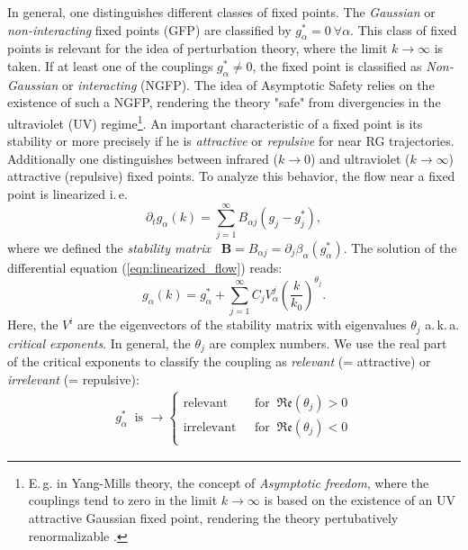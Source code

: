 In general, one distinguishes different classes of fixed points. The \textit{Gaussian} or \textit{non-interacting} fixed points  (GFP) are classified by $g^{*}_{\alpha}=0 \ \forall\alpha$. This class of fixed points is relevant for the idea of perturbation theory, where the limit $k\rightarrow\infty$ is taken. If at least one of the couplings $g^{*}_{\alpha}\neq 0$, the fixed point is classified as \textit{Non-Gaussian} or \textit{interacting} (NGFP). The idea of Asymptotic Safety relies on the existence of such a NGFP, rendering the theory "safe" from divergencies in the ultraviolet (UV) regime\footnote{E.\,g. in Yang-Mills theory, the concept of \textit{Asymptotic freedom}, where the couplings tend to zero in the limit $k\rightarrow\infty$ is based on the existence of an UV attractive Gaussian fixed point, rendering the theory pertubatively renormalizable \cite{GrossWilczek1973}.}. An important characteristic of a fixed point is its stability or more precisely if he is \textit{attractive} or \textit{repulsive} for near RG trajectories. Additionally one distinguishes between infrared ($k\rightarrow0$) and ultraviolet ($k\rightarrow\infty$) attractive (repulsive) fixed points. To analyze this behavior, the flow near a fixed point is linearized i.\,e.
\begin{equation}
	\partial_{t} g_{\alpha}(k)=\sum_{j=1}^{\infty} B_{\alpha j}\left(g_{j}-g_{j}^{*}\right),
	\label{eqn:linearized_flow}
\end{equation}
where we defined the \textit{stability matrix} \ $\mathbf{B} = B_{\alpha j} = \partial_j\beta_{\alpha}(g^{*}_{\alpha}) $. The solution of the differential equation (\ref{eqn:linearized_flow}) reads:
\begin{equation}
	g_{\alpha}(k)=g_{\alpha}^{*}+\sum_{j=1}^{\infty} C_{j} V_{\alpha}^{j}\left(\frac{k}{k_{0}}\right)^{\theta_{j}}.
\end{equation}
Here, the $V^{i}$ are the eigenvectors of the stability matrix with eigenvalues $\theta_j$ a.\,k.\,a. \textit{critical exponents}. In general, the $\theta_{j}$ are complex numbers. We use the real part of the critical exponents to classify the coupling as \textit{relevant} (= attractive) or \textit{irrelevant} (= repulsive):
\begin{align}
	g^{*}_{\alpha} \ \text{ is }  \rightarrow\left\{\begin{array}{ll}{\text{relevant }} & {\text { for } \ \mathfrak{Re}\left(\theta_j\right) > 0} \\[10pt] {\text{irrelevant }} & {\text { for } \  \mathfrak{Re}\left(\theta_j\right) < 0} \\ \end{array}\right.
\end{align}
